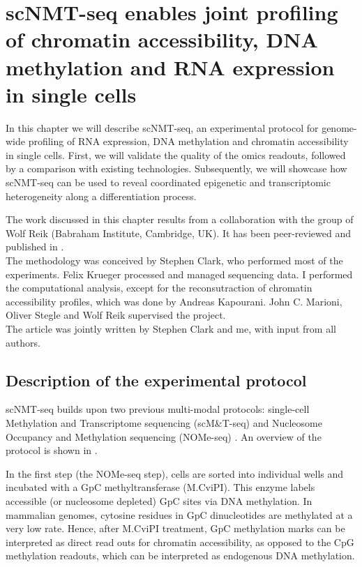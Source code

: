 
\section{scNMT-seq enables joint profiling of chromatin accessibility, DNA methylation and RNA expression in single cells}

\graphicspath{{Chapter1/Figs/}}

In this chapter we will describe scNMT-seq, an experimental protocol for genome-wide profiling of RNA expression, DNA methylation and chromatin accessibility in single cells. First, we will validate the quality of the omics readouts, followed by a comparison with existing technologies. Subsequently, we will showcase how scNMT-seq can be used to reveal coordinated epigenetic and transcriptomic heterogeneity along a differentiation process.

The work discussed in this chapter results from a collaboration with the group of Wolf Reik (Babraham Institute, Cambridge, UK). It has been peer-reviewed and published in \cite{Clark2018}.\\

The methodology was conceived by Stephen Clark, who performed most of the experiments. Felix Krueger processed and managed sequencing data. I performed the computational analysis, except for the reconsutraction of chromatin accessibility profiles, which was done by Andreas Kapourani. John C. Marioni, Oliver Stegle and Wolf Reik supervised the project.\\
The article was jointly written by Stephen Clark and me, with input from all authors.

\subsection{Description of the experimental protocol} \label{section:scnmt_protocol}
scNMT-seq builds upon two previous multi-modal protocols: single-cell Methylation and Transcriptome sequencing (scM\&T-seq) \cite{Angermueller2016} and Nucleosome Occupancy and Methylation sequencing (NOMe-seq) \cite{Kelly2012,Pott2016}. An overview of the protocol is shown in .

In the first step (the NOMe-seq step), cells are sorted into individual wells and incubated with a GpC methyltransferase (M.CviPI). This enzyme labels accessible (or nucleosome depleted) GpC sites via DNA methylation\cite{Kilgore2007, Kelly2012}. In mammalian genomes, cytosine residues in GpC dinucleotides are methylated at a very low rate. Hence, after M.CviPI treatment, GpC methylation marks can be interpreted as direct read outs for chromatin accessibility, as opposed to the CpG methylation readouts, which can be interpreted as endogenous DNA methylation\cite{Kilgore2007, Kelly2012}.

